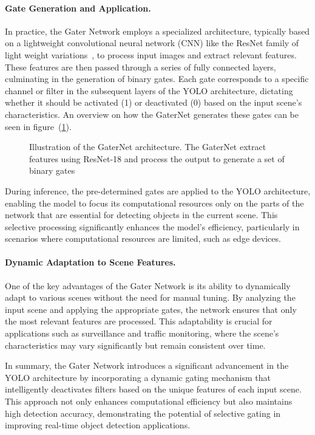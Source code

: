 \paragraph{Gate Generation and Application.} In practice, the Gater Network employs a specialized architecture, typically based on a lightweight convolutional neural network (CNN) like the ResNet family of light weight variations~\cite{he2016deep}, to process input images and extract relevant features. These features are then passed through a series of fully connected layers, culminating in the generation of binary gates. Each gate corresponds to a specific channel or filter in the subsequent layers of the YOLO architecture, dictating whether it should be activated (1) or deactivated (0) based on the input scene's characteristics. An overview on how the GaterNet generates these gates can be seen in figure~(\ref{fig:gaternet_architecture}).

\begin{figure}[ht]
    \centering
    
    \caption{Illustration of the GaterNet architecture. The GaterNet extract features using ResNet-18 and process the output to generate a set of binary gates}
    \label{fig:gaternet_architecture}
    \end{figure}

During inference, the pre-determined gates are applied to the YOLO architecture, enabling the model to focus its computational resources only on the parts of the network that are essential for detecting objects in the current scene. This selective processing significantly enhances the model's efficiency, particularly in scenarios where computational resources are limited, such as edge devices.

\paragraph{Dynamic Adaptation to Scene Features.} One of the key advantages of the Gater Network is its ability to dynamically adapt to various scenes without the need for manual tuning. By analyzing the input scene and applying the appropriate gates, the network ensures that only the most relevant features are processed. This adaptability is crucial for applications such as surveillance and traffic monitoring, where the scene's characteristics may vary significantly but remain consistent over time.

In summary, the Gater Network introduces a significant advancement in the YOLO architecture by incorporating a dynamic gating mechanism that intelligently deactivates filters based on the unique features of each input scene. This approach not only enhances computational efficiency but also maintains high detection accuracy, demonstrating the potential of selective gating in improving real-time object detection applications.

